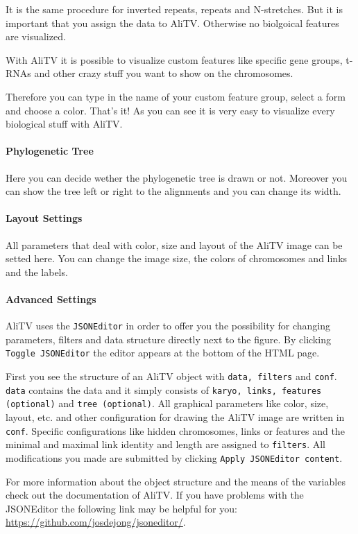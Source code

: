 \documentclass[a4paper]{scrartcl}
\begin{document}
It is the same procedure for inverted repeats, repeats and N-stretches. But it is important that you assign the data to AliTV. Otherwise no biolgoical features are visualized.

With AliTV it is possible to visualize custom features like specific gene groups, t-RNAs and other crazy stuff you want to show on the chromosomes. 

Therefore you can type in the name of your custom feature group, select a form and choose a color. That's it! As you can see it is very easy to visualize every biological stuff with AliTV.

\paragraph*{Phylogenetic Tree}
Here you can decide wether the phylogenetic tree is drawn or not. Moreover you can show the tree left or right to the alignments and you can change its width.

\paragraph*{Layout Settings}
All parameters that deal with color, size and layout of the AliTV image can be setted here. You can change the image size, the colors of chromosomes and links and the labels.

\paragraph*{Advanced Settings}
AliTV uses the \texttt{JSONEditor} in order to offer you the possibility for changing parameters, filters and data structure directly next to the figure. By clicking \texttt{Toggle JSONEditor} the editor appears at the bottom of the HTML page. 

First you see the structure of an AliTV object with \texttt{data, filters} and \texttt{conf}. \texttt{data} contains the data and it simply consists of \texttt{karyo, links, features (optional)} and  \texttt{tree (optional)}. All graphical parameters like color, size, layout, etc. and other configuration for drawing the AliTV image are written in \texttt{conf}. Specific configurations like hidden chromosomes, links or features and the minimal and maximal link identity and length are assigned to \texttt{filters}. All modifications you made are submitted by clicking \texttt{Apply JSONEditor content}.

For more information about the object structure and the means of the variables check out the documentation of AliTV. If you have problems with the JSONEditor the following link may be helpful for you: \url{https://github.com/josdejong/jsoneditor/}.
\end{document}
